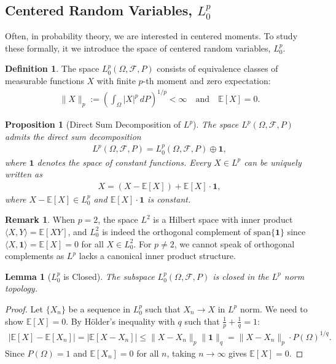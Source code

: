 \documentclass[11pt,reqno]{amsart}
\newtheorem{lemma}[theorem]{Lemma}
\newtheorem{proposition}[theorem]{Proposition}
\theoremstyle{definition}
\newtheorem{definition}[theorem]{Definition}
\newtheorem{remark}[theorem]{Remark}
\theoremstyle{remark}
\begin{document}
\subsection{Centered Random Variables, \(L^p_0\)}

Often, in probability theory, we are interested in centered moments. To study these formally, it we introduce the space of centered random variables, \(L^p_0\).

\begin{definition}
	The space \(L^p_0(\Omega, \mathcal{F}, P)\) consists of equivalence classes of measurable functions $X$ with finite $p$-th moment and zero expectation:
	\begin{align*}
		\|X\|_p := \left( \int_\Omega |X|^p \, dP \right)^{1/p} < \infty \quad \text{and} \quad \mathbb{E}[X] = 0.
	\end{align*}
\end{definition}

\begin{proposition}[Direct Sum Decomposition of $L^p$]
	The space $L^p(\Omega, \mathcal{F}, P)$ admits the direct sum decomposition
	\begin{align*}
		L^p(\Omega, \mathcal{F}, P) = L^p_0(\Omega, \mathcal{F}, P) \oplus \mathbf{1},
	\end{align*}
	where $\mathbf{1}$ denotes the space of constant functions. Every $X \in L^p$ can be uniquely written as
	\begin{align*}
		X = (X - \mathbb{E}[X]) + \mathbb{E}[X] \cdot \mathbf{1},
	\end{align*}
	where $X - \mathbb{E}[X] \in L^p_0$ and $\mathbb{E}[X] \cdot \mathbf{1}$ is constant.
\end{proposition}

\begin{remark}
	When $p = 2$, the space $L^2$ is a Hilbert space with inner product $\langle X, Y \rangle = \mathbb{E}[XY]$, and $L^2_0$ is indeed the orthogonal complement of $\text{span}\{\mathbf{1}\}$ since $\langle X, \mathbf{1} \rangle = \mathbb{E}[X] = 0$ for all $X \in L^2_0$. For $p \neq 2$, we cannot speak of orthogonal complements as $L^p$ lacks a canonical inner product structure.
\end{remark}

\begin{lemma}[$L^p_0$ is Closed]
	The subspace $L^p_0(\Omega, \mathcal{F}, P)$ is closed in the $L^p$ norm topology.
\end{lemma}

\begin{proof}
	Let $\{X_n\}$ be a sequence in $L^p_0$ such that $X_n \to X$ in $L^p$ norm. We need to show $\mathbb{E}[X] = 0$. By Hölder's inequality with $q$ such that $\frac{1}{p} + \frac{1}{q} = 1$:
	\begin{align*}
		|\mathbb{E}[X] - \mathbb{E}[X_n]| = |\mathbb{E}[X - X_n]| \leq \|X - X_n\|_p \|\mathbf{1}\|_q = \|X - X_n\|_p \cdot P(\Omega)^{1/q}.
	\end{align*}
	Since $P(\Omega) = 1$ and $\mathbb{E}[X_n] = 0$ for all $n$, taking $n \to \infty$ gives $\mathbb{E}[X] = 0$.
\end{proof}
\end{document}
